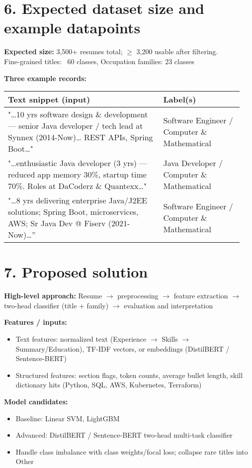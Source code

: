 \documentclass[12pt]{article}
\begin{document}
\section*{6. Expected dataset size and example datapoints}
\textbf{Expected size:} 3,500+ resumes total; $\geq$ 3,200 usable after filtering. \\
Fine-grained titles: ~60 classes, Occupation families: 23 classes

\textbf{Three example records:} \\[2pt]
\begin{tabular}{p{0.62\linewidth} p{0.32\linewidth}}
\toprule
Text snippet (input) & Label(s) \\
\midrule
"…10 yrs software design \& development — senior Java developer / tech lead at Synnex (2014-Now)… REST APIs, Spring Boot…" & Software Engineer / Computer \& Mathematical \\
"…enthusiastic Java developer (3 yrs) — reduced app memory 30\%, startup time 70\%. Roles at DaCoderz \& Quantexx…" & Java Developer / Computer \& Mathematical \\
"…8 yrs delivering enterprise Java/J2EE solutions; Spring Boot, microservices, AWS; Sr Java Dev @ Fiserv (2021-Now)…” & Software Engineer / Computer \& Mathematical \\
\bottomrule
\end{tabular}

\section*{7. Proposed solution}
\textbf{High-level approach:} Resume $\rightarrow$ preprocessing $\rightarrow$ feature extraction $\rightarrow$ two-head classifier (title + family) $\rightarrow$ evaluation and interpretation

\textbf{Features / inputs:}
\begin{itemize}
  \item Text features: normalized text (Experience $\rightarrow$ Skills $\rightarrow$ Summary/Education), TF-IDF vectors, or embeddings (DistilBERT / Sentence-BERT)
  \item Structured features: section flags, token counts, average bullet length, skill dictionary hits (Python, SQL, AWS, Kubernetes, Terraform)
\end{itemize}

\textbf{Model candidates:}
\begin{itemize}
  \item Baseline: Linear SVM, LightGBM
  \item Advanced: DistilBERT / Sentence-BERT two-head multi-task classifier
  \item Handle class imbalance with class weights/focal loss; collapse rare titles into Other
\end{itemize}
\end{document}
